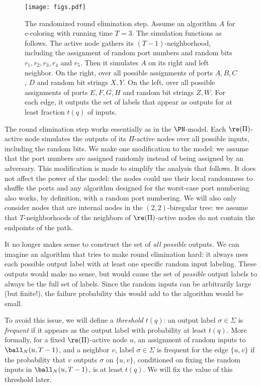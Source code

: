 \begin{figure}
	\centering
	\texttt{[image: figs.pdf]}
	\caption{The randomized round elimination step. Assume an algorithm $A$ for $c$-coloring with running time $T = 3$. The simulation functions as follows. The active node gathers its $(T-1)$-neighborhood, including the assignment of random port numbers and random bits $r_1, r_2, r_3, r_4$ and $r_5$. Then it simulates $A$ on its right and left neighbor. On the right, over all possible assignments of ports $A, B, C$, $D$ and random bit strings $X, Y$. On the left, over all possible assignments of ports $E,F,G,H$ and random bit strings $Z,W$. For each edge, it outputs the set of labels that appear as outputs for at least fraction $t(q)$ of inputs.} \label{fig:rand-re}
\end{figure}

The round elimination step works essentially as in the $\PN$-model. Each $\re(\Pi)$-active node simulates the outputs of its $\Pi$-active nodes over all possible inputs, including the random bits. We make one modification to the model: we assume that the port numbers are assigned randomly instead of being assigned by an adversary. This modification is made to simplify the analysis that follows. It does not affect the power of the model: the nodes could use their local randomness to shuffle the ports and any algorithm designed for the worst-case port numbering also works, by definition, with a random port numbering. We will also only consider nodes that are internal nodes in the $(2,2)$-biregular tree: we assume that $T$-neighborhoods of the neighbors of $\re(\Pi)$-active nodes do not contain the endpoints of the path.

It no longer makes sense to construct the set of \emph{all possible} outputs. We can imagine an algorithm that tries to make round elimination hard: it always uses each possible output label with at least one specific random input labeling. These outputs would make no sense, but would cause the set of \emph{possible} output labels to always be the full set of labels. Since the random inputs can be arbitrarily large (but finite!), the failure probability this would add to the algorithm would be small.

To avoid this issue, we will define a \emph{threshold $t(q)$}: an output label $\sigma \in \Sigma$ is \emph{frequent} if it appears as the output label with probability at least $t(q)$. 
More formally, for a fixed $\re(\Pi)$-active node $u$, an assignment of random inputs to $\ball_N(u,T-1)$, and a neighbor $v$, label $\sigma \in \Sigma$ is frequent for the edge $\{ u, v \}$ if the probability that $v$ outputs $\sigma$ on $\{u,v\}$, conditioned on fixing the random inputs in $\ball_N(u, T-1)$, is at least $t(q)$. We will fix the value of this threshold later.

